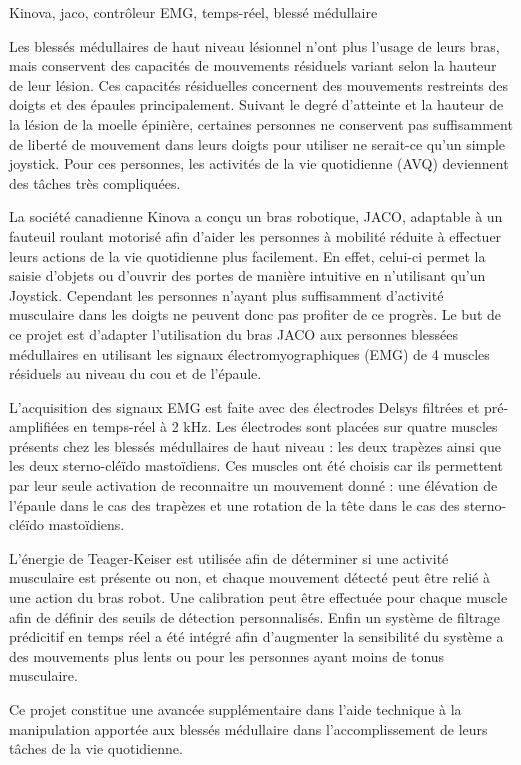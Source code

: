 \documentclass[letterpaper, twoside, 12pt, memoire, creativecommons, hyperref]{thETS}
\begin{document}
\begin{sommaire}{Kinova, jaco, contrôleur EMG, temps-réel, blessé médullaire}

Les blessés médullaires de haut niveau lésionnel n’ont plus l’usage de leurs bras, mais conservent des capacités de mouvements résiduels variant selon la hauteur de leur lésion. Ces capacités résiduelles concernent des mouvements restreints des doigts et des épaules principalement. Suivant le degré d’atteinte et la hauteur de la lésion de la moelle épinière, certaines personnes ne conservent pas suffisamment de liberté de mouvement dans leurs doigts pour utiliser ne serait-ce qu’un simple joystick. Pour ces personnes, les activités de la vie quotidienne (AVQ) deviennent des tâches très compliquées. 

La société canadienne Kinova a conçu un bras robotique, JACO, adaptable à un fauteuil roulant motorisé afin d’aider les personnes à mobilité réduite à effectuer leurs actions de la vie quotidienne plus facilement. En effet, celui-ci permet la saisie d’objets ou d’ouvrir des portes de manière intuitive en n’utilisant qu’un Joystick. Cependant les personnes n’ayant plus suffisamment d’activité musculaire dans les doigts ne peuvent donc pas profiter de ce progrès. Le but de ce projet est d’adapter l’utilisation du bras JACO aux personnes blessées médullaires en utilisant les signaux électromyographiques (EMG) de 4 muscles résiduels au niveau du cou et de l’épaule. 

L’acquisition des signaux EMG est faite avec des électrodes Delsys filtrées et pré-amplifiées en temps-réel à 2 kHz. Les électrodes sont placées sur quatre muscles présents chez les blessés médullaires de haut niveau : les deux trapèzes ainsi que les deux sterno-cléïdo mastoïdiens. Ces muscles ont été choisis car ils permettent par leur seule activation de reconnaitre un mouvement donné : une élévation de l’épaule dans le cas des trapèzes et une rotation de la tête dans le cas des sterno-cléïdo mastoïdiens.

L’énergie de Teager-Keiser est utilisée afin de déterminer si une activité musculaire est présente ou non, et chaque mouvement détecté peut être relié à une action du bras robot. Une calibration peut être effectuée pour chaque muscle afin de définir des seuils de détection personnalisés. Enfin un système de filtrage prédicitif en temps réel a été intégré afin d’augmenter la sensibilité du système a des mouvements plus lents ou pour les personnes ayant moins de tonus musculaire.

Ce projet constitue une avancée supplémentaire dans l’aide technique à la manipulation apportée aux blessés médullaire dans l’accomplissement de leurs tâches de la vie quotidienne. 



\end{sommaire}
\end{document}
